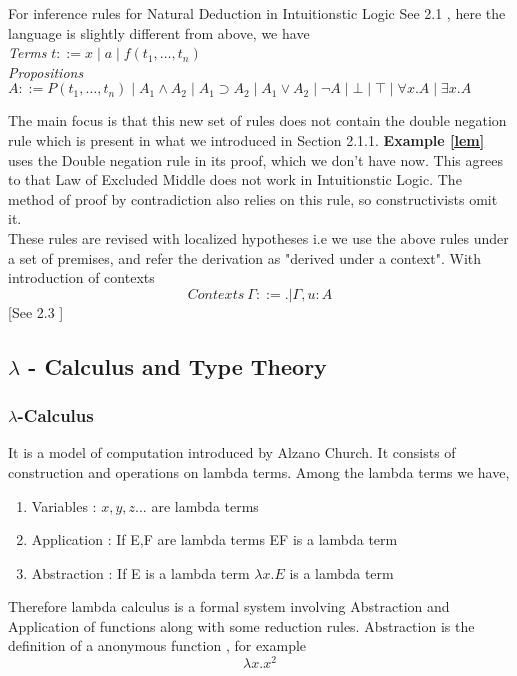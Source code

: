 \documentclass[12pt]{article}
\begin{document}
For inference rules for Natural Deduction in Intuitionstic Logic See 2.1 \cite{Pfenning2004}, here the language is slightly different from above, we have
\\
\textit{Terms} \quad $t ::= x \mid a \mid f(t_1, \ldots, t_n)$
\\
\textit{Propositions} \quad
$A ::= P(t_1, \ldots, t_n) \mid A_1 \land A_2 \mid A_1 \supset A_2 \mid A_1 \lor A_2 \mid \neg A \mid \bot \mid \top \mid \forall x. A \mid \exists x. A$

 The main focus is that this new set of rules does not contain the double negation rule which is present in what we introduced in Section 2.1.1. \textbf {Example \ref{lem}} uses the Double negation rule in its proof, which we don't have now. This agrees to that Law of Excluded Middle does not work in Intuitionstic Logic. The method of proof by contradiction also relies on this rule, so constructivists omit it.\\
These rules are revised with localized hypotheses i.e we use the above rules under a set of premises, and refer the derivation as "derived under a context". With introduction of contexts 
$$Contexts  \ \Gamma ::= .|\Gamma,u: A$$
[See 2.3 \cite{Pfenning2004}]


\subsection{$\lambda$ - Calculus and Type Theory} 

\subsubsection{ $\lambda$-Calculus}
It is a model of computation introduced by Alzano Church. It consists of construction and operations on lambda terms. 
Among the lambda terms we have,
\begin{enumerate}
    \item Variables : $x,y,z ...$ are lambda terms
    \item Application : If E,F are lambda terms EF is a lambda term 
    \item Abstraction : If E is a lambda term $\lambda x. E $ is a lambda term
\end{enumerate}
Therefore lambda calculus is a formal system involving Abstraction and Application of functions along with some reduction rules.
Abstraction is the definition of a anonymous function , for example \\
$$ \lambda x.x^2 $$
\end{document}
